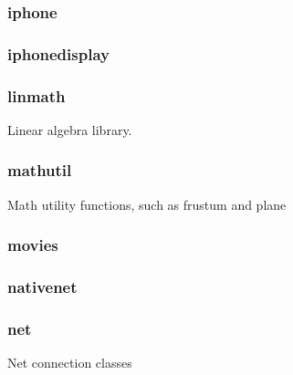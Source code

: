 \documentclass[a4paper]{article}
\begin{document}
\clearpage\subsubsection[iphone]{iphone}
\hypertarget{RefHeading21751167907073}{}\subsubsection{}
\clearpage\subsubsection[iphonedisplay]{iphonedisplay}
\hypertarget{RefHeading21771167907073}{}\subsubsection{}
\clearpage\subsubsection[linmath]{linmath}
\hypertarget{RefHeading21791167907073}{}{\color{black}
Linear algebra library.}

\clearpage\subsubsection[mathutil]{mathutil}
\hypertarget{RefHeading21811167907073}{}{\color{black}
Math utility functions, such as frustum and plane}

\clearpage\subsubsection[movies]{movies}
\hypertarget{RefHeading21831167907073}{}\subsubsection{}
\clearpage\subsubsection[nativenet]{nativenet}
\hypertarget{RefHeading21851167907073}{}\subsubsection{}
\clearpage\subsubsection[net]{net}
\hypertarget{RefHeading21871167907073}{}{\color{black}
Net connection classes}
\end{document}
